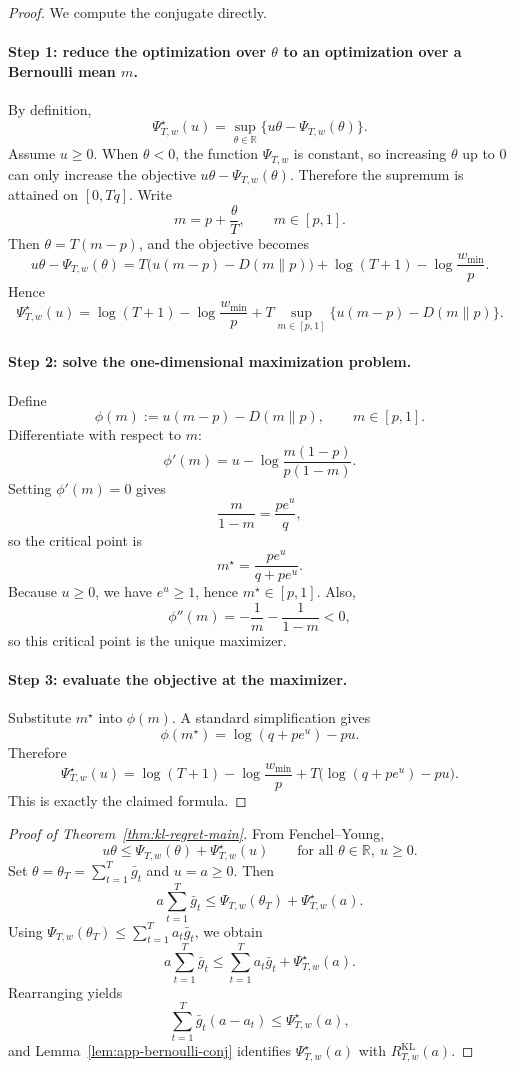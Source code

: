 \documentclass[11pt]{article}
\newcommand{\R}{\mathbb{R}}
\newcommand{\1}{\mathbf{1}}
\begin{document}
\begin{proof}
We compute the conjugate directly.

\paragraph{Step 1: reduce the optimization over $\theta$ to an optimization over a Bernoulli mean $m$.}
By definition,
\[
\Psi_{T,w}^\star(u)=\sup_{\theta\in\R}\{u\theta-\Psi_{T,w}(\theta)\}.
\]
Assume $u\ge 0$. When $\theta<0$, the function $\Psi_{T,w}$ is constant, so increasing $\theta$ up to $0$ can only increase the objective $u\theta-\Psi_{T,w}(\theta)$. Therefore the supremum is attained on $[0,Tq]$.
Write
\[
m=p+\frac{\theta}{T},
\qquad m\in[p,1].
\]
Then $\theta=T(m-p)$, and the objective becomes
\[
u\theta-\Psi_{T,w}(\theta)
=
T\bigl(u(m-p)-D(m\|p)\bigr)+\log(T+1)-\log\frac{w_{\min}}{p}.
\]
Hence
\[
\Psi_{T,w}^\star(u)
=
\log(T+1)-\log\frac{w_{\min}}{p}
+
T\sup_{m\in[p,1]}\bigl\{u(m-p)-D(m\|p)\bigr\}.
\]

\paragraph{Step 2: solve the one-dimensional maximization problem.}
Define
\[
\phi(m):=u(m-p)-D(m\|p),
\qquad m\in[p,1].
\]
Differentiate with respect to $m$:
\[
\phi'(m)=u-\log\frac{m(1-p)}{p(1-m)}.
\]
Setting $\phi'(m)=0$ gives
\[
\frac{m}{1-m}=\frac{pe^u}{q},
\]
so the critical point is
\[
m^\star=\frac{pe^u}{q+pe^u}.
\]
Because $u\ge 0$, we have $e^u\ge 1$, hence $m^\star\in[p,1]$. Also,
\[
\phi''(m)=-\frac{1}{m}-\frac{1}{1-m}<0,
\]
so this critical point is the unique maximizer.

\paragraph{Step 3: evaluate the objective at the maximizer.}
Substitute $m^\star$ into $\phi(m)$. A standard simplification gives
\[
\phi(m^\star)=\log(q+pe^u)-pu.
\]
Therefore
\[
\Psi_{T,w}^\star(u)
=
\log(T+1)-\log\frac{w_{\min}}{p}+T\bigl(\log(q+pe^u)-pu\bigr).
\]
This is exactly the claimed formula.
\end{proof}

\begin{proof}[Proof of Theorem~\ref{thm:kl-regret-main}]
From Fenchel--Young,
\[
u\theta\le \Psi_{T,w}(\theta)+\Psi_{T,w}^\star(u)
\qquad\text{for all }\theta\in\R,\ u\ge 0.
\]
Set \(\theta=\theta_T=\sum_{t=1}^T \bar g_t\) and \(u=a\ge 0\). Then
\[
a\sum_{t=1}^T \bar g_t
\le
\Psi_{T,w}(\theta_T)+\Psi_{T,w}^\star(a).
\]
Using \(\Psi_{T,w}(\theta_T)\le \sum_{t=1}^T a_t\bar g_t\), we obtain
\[
a\sum_{t=1}^T \bar g_t
\le
\sum_{t=1}^T a_t\bar g_t+\Psi_{T,w}^\star(a).
\]
Rearranging yields
\[
\sum_{t=1}^T \bar g_t(a-a_t)\le \Psi_{T,w}^\star(a),
\]
and Lemma~\ref{lem:app-bernoulli-conj} identifies \(\Psi_{T,w}^\star(a)\) with \(R_{T,w}^{\mathrm{KL}}(a)\).
\end{proof}
\end{document}
